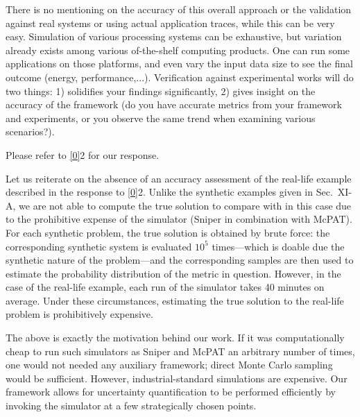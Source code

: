 \begin{reviewer}
There is no mentioning on the accuracy of this overall approach or the
validation against real systems or using actual application traces, while this
can be very easy. Simulation of various processing systems can be exhaustive,
but variation already exists among various of-the-shelf computing products. One
can run some applications on those platforms, and even vary the input data size
to see the final outcome (energy, performance,...). Verification against
experimental works will do two things: 1) solidifies your findings
significantly, 2) gives insight on the accuracy of the framework (do you have
accurate metrics from your framework and experiments, or you observe the same
trend when examining various scenarios?).
\end{reviewer}

\begin{authors}
Please refer to \cref{0}{2} for our response.

Let us reiterate on the absence of an accuracy assessment of the real-life
example described in the response to \cref{0}{2}. Unlike the synthetic examples
given in Sec.~XI-A, we are not able to compute the true solution to compare with
in this case due to the prohibitive expense of the simulator (Sniper in
combination with McPAT). For each synthetic problem, the true solution is
obtained by brute force: the corresponding synthetic system is evaluated $10^5$
times---which is doable due the synthetic nature of the problem---and the
corresponding samples are then used to estimate the probability distribution of
the metric in question. However, in the case of the real-life example, each run
of the simulator takes 40 minutes on average. Under these circumstances,
estimating the true solution to the real-life problem is prohibitively
expensive.

The above is exactly the motivation behind our work. If it was computationally
cheap to run such simulators as Sniper and McPAT an arbitrary number of times,
one would not needed any auxiliary framework; direct Monte Carlo sampling would
be sufficient. However, industrial-standard simulations are expensive. Our
framework allows for uncertainty quantification to be performed efficiently by
invoking the simulator at a few strategically chosen points.

\begin{actions}
\end{actions}
\end{authors}
